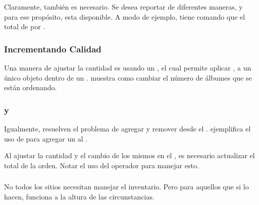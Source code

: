 \subsubsection{\aggregationDB}

Claramente, \aggregationDB también es necesario. Se desea reportar \ordersCommerce de diferentes maneras, y para ese propósito, \mapReduce esta disponible. A modo de ejemplo,  tiene comando \mapReduce que \aggregatesDB el total de \ordersCommerce por \zipCode.

\subsubsection{\updating \ordersCommerce}

\subsubsection*{Incrementando Calidad}

Una manera de ajustar la cantidad es usando un \positionOperatorDB, el cual permite aplicar \atomicOperationsDB, a un único objeto dentro de un \arrayPL.  muestra como cambiar el número de álbumes que se están ordenando.

 
\subsubsection*{\adding y \removing \itemsCOM}

Igualmente, \atomicOperationsDB resuelven el problema de agregar y remover \itemCOM desde el \cartCOM.  ejemplifica el uso de \pushOperatorDB \atomicOperatorDB para agregar un \itemCOM al \cartCOM.


Al ajustar la cantidad y el cambio de los mismos \itemsCOM en el \cartCOM, es necesario actualizar el total de la orden. Notar el uso del operador \incOperatorDB para manejar esto.

\subsubsection{\inventoryCommerce}

No todos los sitios \ecommerce necesitan manejar el inventario. Pero para aquellos que si lo hacen, \mongodbNAME funciona a la altura de las circunstancias.


